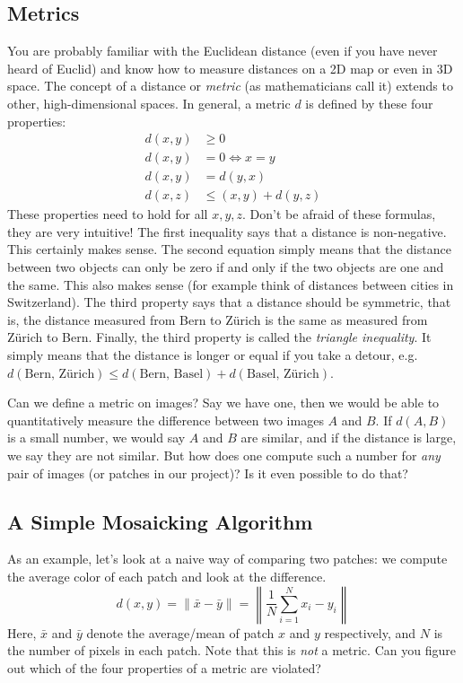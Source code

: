 \documentclass[a4paper]{article}
\begin{document}
	\subsection{Metrics}
		You are probably familiar with the Euclidean distance (even if you have never heard of Euclid) and know how to measure distances on a 2D map or even in 3D space. 
		The concept of a distance or \emph{metric} (as mathematicians call it) extends to other, high-dimensional spaces.
		In general, a metric $d$ is defined by these four properties:
		\begin{align}
			d(x, y) &\geq 0 \\
			d(x, y) &= 0 \iff x = y \\
			d(x, y) &= d(y, x) \\
			d(x, z) &\leq (x, y) + d(y, z) 
		\end{align}
		These properties need to hold for all $x, y, z$.
		Don't be afraid of these formulas, they are very intuitive!
		The first inequality says that a distance is non-negative. 
		This certainly makes sense.
		The second equation simply means that the distance between two objects can only be zero if and only if the two objects are one and the same.
		This also makes sense (for example think of distances between cities in Switzerland).
		The third property says that a distance should be symmetric, that is, the distance measured from Bern to Z\"urich is the same as measured from Z\"urich to Bern.
		Finally, the third property is called the \emph{triangle inequality}. 
		It simply means that the distance is longer or equal if you take a detour, e.g.\@ 
		$d(\text{Bern, Z\"urich}) \leq d(\text{Bern, Basel}) + d(\text{Basel, Z\"urich})$.
		
		Can we define a metric on images? 
		Say we have one, then we would be able to quantitatively measure the difference between two images $A$ and $B$. 
		If $d(A, B)$ is a small number, we would say $A$ and $B$ are similar, and if the distance is large, we say they are not similar.
		But how does one compute such a number for \emph{any} pair of images (or patches in our project)?
		Is it even possible to do that?
		
	\subsection{A Simple Mosaicking Algorithm}\label{sec:simple-mosaicking}
		As an example, let's look at a naive way of comparing two patches: we compute the average color of each patch and look at the difference.
		\begin{equation}\label{eq:mean-color-distance}
			d(x, y) = \lVert \bar{x} - \bar{y} \rVert = \left\lVert \frac{1}{N} \sum_{i=1}^{N} x_i - y_i  \right\rVert
		\end{equation}
		Here, $\bar{x}$ and $\bar{y}$ denote the average/mean of patch $x$ and $y$ respectively, and $N$ is the number of pixels in each patch.
		Note that this is \emph{not} a metric. 
		Can you figure out which of the four properties of a metric are violated?
		
\end{document}
